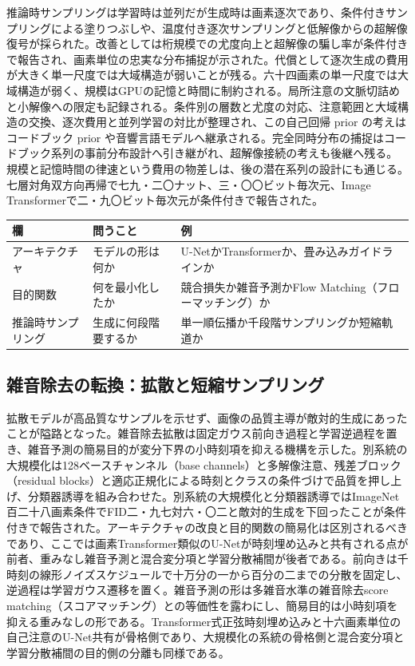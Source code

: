 \documentclass[lualatex,a4paper,10pt]{jlreq}
\begin{document}
推論時サンプリングは学習時は並列だが生成時は画素逐次であり、条件付きサンプリングによる塗りつぶしや、温度付き逐次サンプリングと低解像からの超解像復号が採られた\autocite{btd017,btd018}。改善としては桁規模での尤度向上と超解像の騙し率が条件付きで報告され、画素単位の忠実な分布捕捉が示された\autocite{btd017,btd018}。代償として逐次生成の費用が大きく単一尺度では大域構造が弱いことが残る。六十四画素の単一尺度では大域構造が弱く、規模はGPUの記憶と時間に制約される\autocite{btd017}。局所注意の文脈切詰めと小解像への限定も記録される\autocite{btd018}。条件別の層数と尤度の対応、注意範囲と大域構造の交換、逐次費用と並列学習の対比が整理され、この自己回帰 prior の考えはコードブック prior や音響言語モデルへ継承される。完全同時分布の捕捉はコードブック系列の事前分布設計へ引き継がれ、超解像接続の考えも後継へ残る。規模と記憶時間の律速という費用の物差しは、後の潜在系列の設計にも通じる。七層対角双方向再帰で七九・二〇ナット、三・〇〇ビット毎次元、Image Transformerで二・九〇ビット毎次元が条件付きで報告された\autocite{btd017,btd018}。

\begin{center}
\small
\begin{tabularx}{\textwidth}{@{}p{}p{}X@{}}
\toprule
欄 & 問うこと & 例 \\
\midrule
アーキテクチャ & モデルの形は何か & U-NetかTransformerか、畳み込みガイドラインか \\
目的関数 & 何を最小化したか & 競合損失か雑音予測かFlow Matching（フローマッチング）か \\
推論時サンプリング & 生成に何段階要するか & 単一順伝播か千段階サンプリングか短縮軌道か \\
\bottomrule
\end{tabularx}
\end{center}

\subsection{雑音除去の転換：拡散と短縮サンプリング}
拡散モデルが高品質なサンプルを示せず、画像の品質主導が敵対的生成にあったことが隘路となった。雑音除去拡散は固定ガウス前向き過程と学習逆過程を置き、雑音予測の簡易目的が変分下界の小時刻項を抑える機構を示した\autocite{btd019}。別系統の大規模化は128ベースチャンネル（base channels）と多解像注意、残差ブロック（residual blocks）と適応正規化による時刻とクラスの条件づけで品質を押し上げ、分類器誘導を組み合わせた\autocite{btd030}。別系統の大規模化と分類器誘導ではImageNet百二十八画素条件でFID二・九七対六・〇二と敵対的生成を下回ったことが条件付きで報告された\autocite{btd030}。アーキテクチャの改良と目的関数の簡易化は区別されるべきであり、ここでは画素Transformer類似のU-Netが時刻埋め込みと共有される点が前者、重みなし雑音予測と混合変分項と学習分散補間が後者である\autocite{btd019,btd030}。前向きは千時刻の線形ノイズスケジュールで十万分の一から百分の二までの分散を固定し、逆過程は学習ガウス遷移を置く\autocite{btd019}。雑音予測の形は多雑音水準の雑音除去score matching（スコアマッチング）との等価性を露わにし、簡易目的は小時刻項を抑える重みなしの形である\autocite{btd019}。Transformer式正弦時刻埋め込みと十六画素単位の自己注意のU-Net共有が骨格側であり、大規模化の系統の骨格側と混合変分項と学習分散補間の目的側の分離も同様である\autocite{btd019,btd030}。
\end{document}
